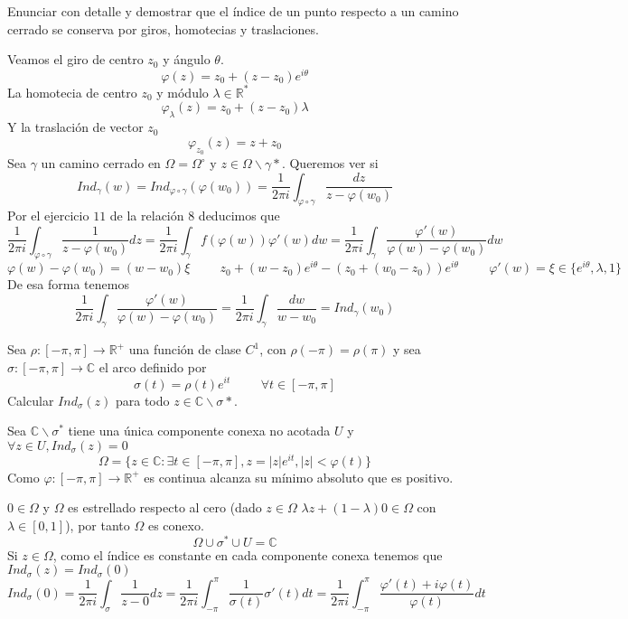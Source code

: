 \begin{ejer}
	Enunciar con detalle y demostrar que el índice de un punto respecto a un camino cerrado
	se conserva por giros, homotecias y traslaciones.
\end{ejer}

\begin{sol}
Veamos el giro de centro $z_0$ y ángulo $\theta$.
$$\varphi(z) = z_0 + (z-z_0)e^{i\theta}$$
La homotecia de centro $z_0$ y módulo $\lambda\in\mathbb{R}^{\ast}$
$$\varphi_{\lambda}(z) = z_0 + (z-z_0)\lambda$$
Y la traslación de vector $z_0$
$$\varphi_{z_0} (z) = z+z_0$$
Sea $\gamma$ un camino cerrado en $\Omega=\Omega^{\circ}$
y $z\in\Omega\backslash\gamma{\ast}$.
Queremos ver si  $$Ind_{\gamma}(w)=Ind_{\varphi\circ\gamma} (\varphi(w_0)) = \frac{1}{2\pi i} \int_{\varphi\circ\gamma} \frac{dz}{z-\varphi(w_0)}$$ 
Por el ejercicio $11$ de la relación $8$ deducimos que
$$\frac{1}{2\pi i} \int_{\varphi\circ\gamma} \frac{1}{z-\varphi(w_0)} dz = \frac{1}{2\pi i} \int_{\gamma} f(\varphi(w))\varphi'(w) dw = \frac{1}{2\pi i} \int_{\gamma} \frac{\varphi'(w)}{\varphi(w)-\varphi(w_0)} dw$$
$$\varphi(w)-\varphi(w_0) = (w-w_0) \xi \hspace{1cm}
z_0+(w-z_0)e^{i\theta}-(z_0+(w_0-z_0))e^{i\theta} \hspace{1cm}\varphi'(w) = \xi \in \{ e^{i\theta},\lambda,1 \}$$
De esa forma tenemos 
$$\frac{1}{2\pi i} \int_{\gamma} \frac{\varphi'(w)}{\varphi(w)-\varphi(w_0)} = \frac{1}{2\pi i} \int_{\gamma} \frac{dw}{w-w_0} = Ind_{\gamma}(w_0)$$
\end{sol}


\begin{ejer}
	Sea $\rho : [-\pi,\pi]\rightarrow\mathbb{R}^+$ una función de clase $C^1$, con $\rho(-\pi) = \rho(\pi)$ y sea $\sigma :[-\pi,\pi] \rightarrow\mathbb{C}$ el arco definido por
	$$ \sigma(t) = \rho(t)e^{it} \hspace{1cm} \forall t\in [-\pi,\pi] $$
	Calcular $Ind_{\sigma}(z)$ para todo $z\in\mathbb{C}\backslash\sigma{\ast}$.
\end{ejer}
\begin{sol}

Sea $\mathbb{C}\backslash\sigma^{\ast}$ tiene una única componente conexa no acotada $U$ y $\forall z\in U, Ind_{\sigma}(z)=0$
$$\Omega = \{ z\in\mathbb{C} : \exists t\in[-\pi,\pi], z=|z|e^{it}, |z|<\varphi(t) \}$$
Como $\varphi : [-\pi,\pi] \rightarrow \mathbb{R}^+$ es continua alcanza su mínimo absoluto que es positivo.

$0\in\Omega$ y $\Omega$ es estrellado respecto al cero
(dado $z\in\Omega$ $\lambda z + (1-\lambda)0 \in\Omega$ con $\lambda\in[0,1]$), por tanto $\Omega$ es conexo.
$$\Omega \cup \sigma^{\ast} \cup U = \mathbb{C}$$
Si $z\in\Omega$, como el índice es constante en cada componente conexa tenemos que $Ind_{\sigma}(z) = Ind_{\sigma}(0)$
$$Ind_{\sigma}(0) = \frac{1}{2\pi i} \int_{\sigma} \frac{1}{z-0}dz = \frac{1}{2\pi i} \int_{-\pi}^{\pi} \frac{1}{\sigma(t)} \sigma'(t)dt = \frac{1}{2\pi i} \int_{-\pi}^{\pi} \frac{\varphi'(t)+i\varphi(t)}{\varphi(t)} dt$$

\end{sol}



